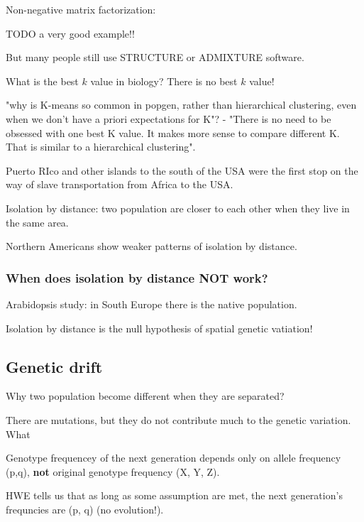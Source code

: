 \documentclass[main.tex]{subfiles}
\begin{document}
\begin{leftbar}

Non-negative matrix factorization:

TODO a very good example!! %

But many people still use STRUCTURE or ADMIXTURE software.

\end{leftbar}

What is the best $ k $ value in biology?
There is no best $ k $ value!

"why is K-means so common in popgen, rather than hierarchical clustering, even when we don't have a priori expectations for K"?
- "There is no need to be obsessed with one best K value. It makes more sense to compare different K. That is similar to a hierarchical clustering".

Puerto RIco and other islands to the south of the USA were the first stop on the way of slave transportation from Africa to the USA.

Isolation by distance: two population are closer to each other when they live in the same area.

Northern Americans show weaker patterns of isolation by distance.

\subsubsection{When does isolation by distance NOT work?}

Arabidopsis study: in South Europe there is the native population.

Isolation by distance is the null hypothesis of spatial genetic vatiation! \\

\subsection{Genetic drift}

Why two population become different when they are separated?

There are mutations, but they do not contribute much to the genetic variation.
What 

Genotype frequencey of the next generation depends only on allele frequency (p,q), \textbf{not} original genotype frequency (X, Y, Z).

HWE tells us that as long as some assumption are met, the next generation's frequncies are (p, q) (no evolution!).
\end{document}
